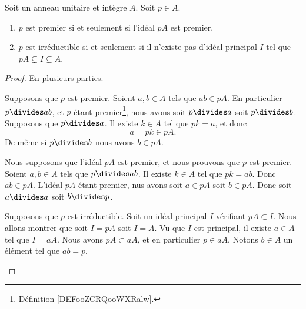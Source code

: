 \begin{proposition}		\label{PROPooZBTIooRhAhvg}
	Soit un anneau unitaire et intègre \( A\). Soit \( p\in A\).
	\begin{enumerate}
		\item		\label{ITEMooJWRYooHndNpV}
		      \( p\) est premier si et seulement si l'idéal \( pA\) est premier.
		\item		\label{ITEMooGHGCooRkJilg}
		      \( p\) est irréductible si et seulement si il n'existe pas d'idéal principal \( I\) tel que \( pA\subsetneq I\subsetneq A\).
	\end{enumerate}
\end{proposition}

\begin{proof}
	En plusieurs parties.
	\begin{subproof}
		\spitem[\ref{ITEMooJWRYooHndNpV}\( \Rightarrow\)]

		Supposons que \( p\) est premier. Soient \( a,b\in A\) tels que \( ab\in pA\). En particulier \( p\divides ab\), et \( p\) étant premier\footnote{Définition \ref{DEFooZCRQooWXRalw}.}, nous avons soit \( p\divides a\) soit \( p\divides b\). Supposons que \( p\divides a\). Il existe \( k\in A\) tel que \( pk=a\), et donc
		\begin{equation}
			a=pk\in pA.
		\end{equation}
		De même si \( p\divides b\) nous avons \( b\in pA\).

		\spitem[\ref{ITEMooJWRYooHndNpV}\( \Leftarrow\)]

		Nous supposons que l'idéal \( pA\) est premier, et nous prouvons que \( p\) est premier. Soient \( a,b\in A\) tels que \( p\divides ab\). Il existe \( k\in A\) tel que \( pk=ab\). Donc \( ab\in pA\). L'idéal \( pA\) étant premier, nus avons soit \( a\in pA\) soit \( b\in pA\). Donc soit \( a\divides a\) soit \( b\divides p\).

		\spitem[\ref{ITEMooGHGCooRkJilg}\( \Rightarrow\)]

		Supposons que \( p\) est irréductible. Soit un idéal principal \( I\) vérifiant \( pA\subset I\). Nous allons montrer que soit \( I=pA\) soit \( I=A\). Vu que \( I\) est principal, il existe \( a\in A\) tel que \( I=aA\). Nous avons \( pA\subset aA\), et en particulier \( p\in aA\). Notons \( b\in A\) un élément tel que \( ab=p\).


\end{subproof}
\end{proof}
